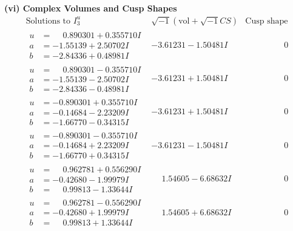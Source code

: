 \documentclass[1p]{elsarticle_modified}
\theoremstyle{definition}
\newcommand{\I}{\sqrt{-1}}
\begin{document}
\newpage\flushleft \textbf{(vi) Complex Volumes and Cusp Shapes}
$$\begin{array}{c|c|c}  
\text{Solutions to }I^u_{3}& \I (\text{vol} + \sqrt{-1}CS) & \text{Cusp shape}\\
 \hline 
\begin{aligned}
u &= \phantom{-}0.890301 + 0.355710 I \\
a &= -1.55139 + 2.50702 I \\
b &= -2.84336 + 0.48981 I\end{aligned}
 & -3.61231 - 1.50481 I & \phantom{-0.000000 } 0 \\ \hline\begin{aligned}
u &= \phantom{-}0.890301 - 0.355710 I \\
a &= -1.55139 - 2.50702 I \\
b &= -2.84336 - 0.48981 I\end{aligned}
 & -3.61231 + 1.50481 I & \phantom{-0.000000 } 0 \\ \hline\begin{aligned}
u &= -0.890301 + 0.355710 I \\
a &= -0.14684 - 2.23209 I \\
b &= -1.66770 - 0.34315 I\end{aligned}
 & -3.61231 + 1.50481 I & \phantom{-0.000000 } 0 \\ \hline\begin{aligned}
u &= -0.890301 - 0.355710 I \\
a &= -0.14684 + 2.23209 I \\
b &= -1.66770 + 0.34315 I\end{aligned}
 & -3.61231 - 1.50481 I & \phantom{-0.000000 } 0 \\ \hline\begin{aligned}
u &= \phantom{-}0.962781 + 0.556290 I \\
a &= -0.42680 - 1.99979 I \\
b &= \phantom{-}0.99813 - 1.33644 I\end{aligned}
 & \phantom{-}1.54605 - 6.68632 I & \phantom{-0.000000 } 0 \\ \hline\begin{aligned}
u &= \phantom{-}0.962781 - 0.556290 I \\
a &= -0.42680 + 1.99979 I \\
b &= \phantom{-}0.99813 + 1.33644 I\end{aligned}
 & \phantom{-}1.54605 + 6.68632 I & \phantom{-0.000000 } 0 \\ \hline\begin{aligned}

\end{aligned}
\end{array}$$
\end{document}
